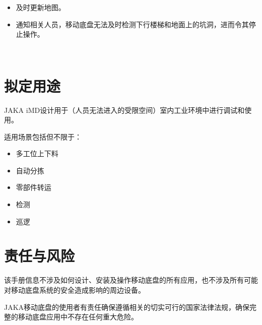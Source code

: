 \documentclass[a4paper,11pt,english,openany,oneside]{sphinxmanual}
\begin{document}
\begin{savenotes}
\begin{tabular}[t]{}
\begin{varwidth}[t]{}
\begin{itemize}
\begin{itemize}
\item {} 
\sphinxAtStartPar
及时更新地图。

\item {} 
\sphinxAtStartPar
通知相关人员，移动底盘无法及时检测下行楼梯和地面上的坑洞，进而令其停止操作。

\end{itemize}

\end{itemize}
\sphinxbeforeendvarwidth
\end{varwidth}%
\\
\sphinxbottomrule
\end{tabular}
\sphinxtableafterendhook\par
\sphinxattableend\end{savenotes}


\section{拟定用途}
\label{\detokenize{05 _u5b89_u5168_u89c4_u8303:id6}}
\sphinxAtStartPar
JAKA iM\sphinxhyphen{}D设计用于（人员无法进入的受限空间）室内工业环境中进行调试和使用。

\sphinxAtStartPar
适用场景包括但不限于：
\begin{itemize}
\item {} 
\sphinxAtStartPar
多工位上下料

\item {} 
\sphinxAtStartPar
自动分拣

\item {} 
\sphinxAtStartPar
零部件转运

\item {} 
\sphinxAtStartPar
检测

\item {} 
\sphinxAtStartPar
巡逻

\end{itemize}


\section{责任与风险}
\label{\detokenize{05 _u5b89_u5168_u89c4_u8303:id7}}
\sphinxAtStartPar
{}

\sphinxAtStartPar
该手册信息不涉及如何设计、安装及操作移动底盘的所有应用，也不涉及所有可能对移动底盘系统的安全造成影响的周边设备。

\sphinxAtStartPar
JAKA移动底盘的使用者有责任确保遵循相关的切实可行的国家法律法规，确保完整的移动底盘应用中不存在任何重大危险。
\end{document}
